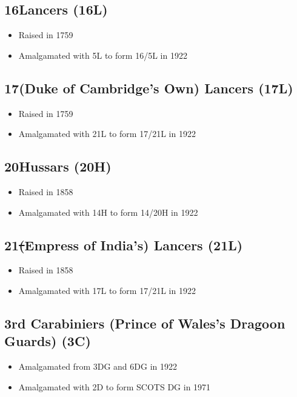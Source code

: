 \subsection*{16\nth Lancers (16L)}

\begin{itemize}
\item Raised in 1759
\item Amalgamated with 5L to form 16/5L in 1922
\end{itemize}

\subsection*{17\nth (Duke of Cambridge's Own) Lancers (17L)}

\begin{itemize}
\item Raised in 1759
\item Amalgamated with 21L to form 17/21L in 1922
\end{itemize}

\subsection*{20\nth Hussars (20H)}

\begin{itemize}
\item Raised in 1858
\item Amalgamated with 14H to form 14/20H in 1922
\end{itemize}

\subsection*{21\st (Empress of India's) Lancers (21L)}

\begin{itemize}
\item Raised in 1858
\item Amalgamated with 17L to form 17/21L in 1922
\end{itemize}

\subsection*{3rd Carabiniers (Prince of Wales's Dragoon Guards) (3C)}

\begin{itemize}
\item Amalgamated from 3DG and 6DG in 1922
\item Amalgamated with 2D to form SCOTS DG in 1971
\end{itemize}

